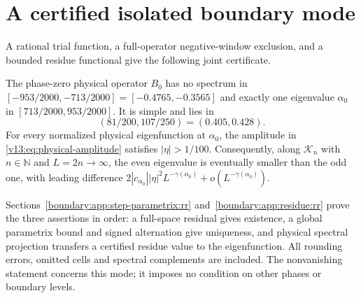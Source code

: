 \section{A certified isolated boundary mode}
\label{boundary:sec:isolated-mode:rr}
\label{boundary:sec:certified-residue:rr}

A rational trial function, a full-operator negative-window exclusion,
and a bounded residue functional give the following joint certificate.

\begin{theorem}
\label{v12:prop:certified-boundary-eigenvalue}
\label{boundary:thm:negative-exclusion:rr}
\label{boundary:thm:certified-residue:rr}
The phase-zero physical operator $B_0$ has no spectrum in
$[-953/2000,-713/2000]=[-0.4765,-0.3565]$ and exactly one eigenvalue
$\alpha_0$ in $[713/2000,953/2000]$. It is simple and lies in
\[
 (81/200,107/250)=(0.405,0.428).
\]
For every normalized physical eigenfunction at $\alpha_0$, the amplitude
in \eqref{v13:eq:physical-amplitude} satisfies $|\eta|>1/100$.
Consequently, along $\mathcal K_n$ with $n\in\mathbb N$ and $L=2n\to\infty$,
the even eigenvalue is eventually smaller than the odd one, with leading difference
$2|c_{\alpha_0}||\eta|^2L^{-\gamma(\alpha_0)}+o(L^{-\gamma(\alpha_0)})$.
\end{theorem}

Sections~\ref{boundary:app:step-parametrix:rr}
and~\ref{boundary:app:residue:rr} prove the three assertions in order:
a full-space residual gives existence, a global parametrix bound and
signed alternation give uniqueness, and physical spectral projection
transfers a certified residue value to the eigenfunction. All rounding
errors, omitted cells and spectral complements are included. The
nonvanishing statement concerns this mode; it imposes no condition on
other phases or boundary levels.
